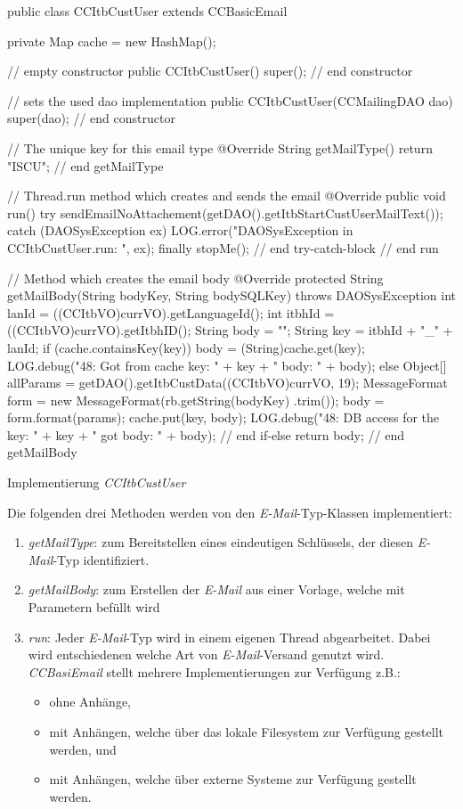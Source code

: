 \begin{program}
\begin{JavaCode}
public class CCItbCustUser extends CCBasicEmail {
	
	private Map cache = new HashMap();

	// empty constructor
	public CCItbCustUser() {
		super();
	} // end constructor
	
	// sets the used dao implementation
	public CCItbCustUser(CCMailingDAO dao) {
		super(dao);
	} // end constructor

	// The unique key for this email type
	@Override
	String getMailType() {
		return "ISCU";
	} // end getMailType
	
	// Thread.run method which creates and sends the email
	@Override
	public void run() {
		try {
			sendEmailNoAttachement(getDAO().getItbStartCustUserMailText());
		} catch (DAOSysException ex) {
			LOG.error("DAOSysException in CCItbCustUser.run: ", ex);
		} finally {
			stopMe();
		} // end try-catch-block
	} // end run
	
	// Method which creates the email body
	@Override
	protected String getMailBody(String bodyKey, String bodySQLKey)
		throws DAOSysException {
		int lanId   = ((CCItbVO)currVO).getLanguageId();
		int itbhId  = ((CCItbVO)currVO).getItbhID();
		String body = "";
		String key  = itbhId + "_" + lanId;
		if (cache.containsKey(key)) {
			body = (String)cache.get(key);
			LOG.debug("48: Got from cache key: " + key 
					  + " body: " + body);
		} else {
			Object[] allParams = getDAO().getItbCustData((CCItbVO)currVO, 19);
			MessageFormat form = new MessageFormat(rb.getString(bodyKey)
			                                         .trim());
	 		body               = form.format(params);
	 		cache.put(key, body);
	 		LOG.debug("48: DB access for the key: " + key
	 				+ " got body: " + body);
		} // end if-else
		return body;
	} // end getMailBody
}
\end{JavaCode}
\caption{Implementierung \emph{CCItbCustUser}}
\label{fig:code-ccitbcustuser}
\label{CCItbCustUser.java}
\end{program}
\newpage
Die folgenden drei Methoden werden von den \emph{E-Mail}-Typ-Klassen implementiert:
\begin{enumerate}
	\item\emph{getMailType}: zum Bereitstellen eines eindeutigen Schlüssels, der diesen \emph{E-Mail}-Typ identifiziert.
	\item\emph{getMailBody}: zum Erstellen der \emph{E-Mail} aus einer Vorlage, welche mit Parametern befüllt wird
	\item\emph{run}: Jeder \emph{E-Mail}-Typ wird in einem eigenen Thread abgearbeitet. Dabei wird entschiedenen welche Art von \emph{E-Mail}-Versand genutzt wird. \emph{CCBasiEmail} stellt mehrere Implementierungen zur Verfügung z.B.:
	\begin{itemize}
		\item ohne Anhänge, 
		\item mit Anhängen, welche über das lokale Filesystem zur Verfügung gestellt werden, und
		\item mit Anhängen, welche über externe Systeme zur Verfügung gestellt werden.
	\end{itemize}
\end{enumerate}
